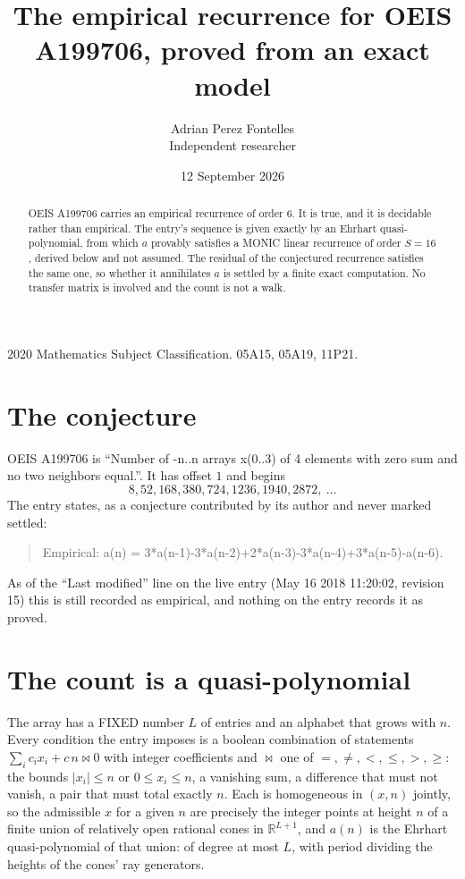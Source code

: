 \documentclass[11pt,a4paper]{article}
\title{The empirical recurrence for OEIS A199706, proved from an exact model}
\author{Adrian Perez Fontelles\\ \small Independent researcher}
\date{12 September 2026}
\theoremstyle{plain}
\theoremstyle{definition}
\begin{document}
\maketitle

\begin{abstract}
OEIS A199706 carries an empirical recurrence of order $6$. It is true, and it is
decidable rather than empirical. The entry's sequence is given exactly by an Ehrhart quasi-polynomial, from
which $a$ provably satisfies a MONIC linear recurrence of order $S=16$, derived below and not
assumed. The residual of the conjectured recurrence satisfies the same one, so whether it
annihilates $a$ is settled by a finite exact computation. No transfer matrix is involved and
the count is not a walk.
\end{abstract}

\noindent\small 2020 Mathematics Subject Classification. 05A15, 05A19, 11P21.\normalsize

\section{The conjecture}

OEIS A199706 is ``Number of -n..n arrays x(0..3) of 4 elements with zero sum and no two neighbors equal.''. It has offset $1$ and begins
\[
8, 52, 168, 380, 724, 1236, 1940, 2872,\ \dots
\]
The entry states, as a conjecture contributed by its author and never marked settled:
\begin{quote}
Empirical: a(n) = 3*a(n-1)-3*a(n-2)+2*a(n-3)-3*a(n-4)+3*a(n-5)-a(n-6).
\end{quote}
As of the ``Last modified'' line on the live entry (May 16 2018 11:20:02, revision 15)
this is still recorded as empirical, and nothing on the entry records it as proved.

\section{The count is a quasi-polynomial}

The array has a FIXED number $L$ of entries and an alphabet that grows with $n$. Every
condition the entry imposes is a boolean combination of statements
$\sum_i c_ix_i + c\,n \bowtie 0$ with integer coefficients and $\bowtie$ one of
$=,\ne,<,\le,>,\ge$: the bounds $|x_i|\le n$ or $0\le x_i\le n$, a vanishing sum, a difference
that must not vanish, a pair that must total exactly $n$. Each is homogeneous in $(x,n)$
jointly, so the admissible $x$ for a given $n$ are precisely the integer points at height $n$
of a finite union of relatively open rational cones in $\mathbb{R}^{L+1}$, and $a(n)$ is
the Ehrhart quasi-polynomial of that union: of degree at most $L$, with period dividing the
heights of the cones' ray generators.
\end{document}
